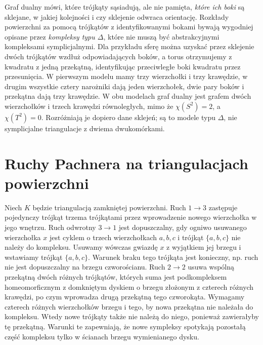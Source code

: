 \begin{uwaga}
Graf dualny mówi, które trójkąty sąsiadują, ale nie pamięta,
\emph{które ich boki} są sklejane, w jakiej kolejności i czy
sklejenie odwraca orientację. Rozkłady powierzchni za pomocą
trójkątów z identyfikowanymi bokami bywają wygodniej opisane
przez \emph{kompleksy typu $\Delta$}, które nie muszą być
abstrakcyjnymi kompleksami symplicjalnymi. Dla przykładu
sferę można uzyskać przez sklejenie dwóch trójkątów wzdłuż
odpowiadających boków, a torus otrzymujemy z kwadratu z jedną przekątną,
identyfikując przeciwległe boki kwadratu przez przesunięcia.
W pierwszym modelu mamy trzy wierzchołki i trzy krawędzie,
w drugim wszystkie cztery narożniki dają jeden wierzchołek,
dwie pary boków i przekątna dają trzy krawędzie. W obu
modelach graf dualny jest grafem dwóch wierzchołków
i trzech krawędzi równoległych, mimo że
$\chi(S^2)=2$, a $\chi(T^2)=0$. Rozróżniają je dopiero
dane sklejeń; są to modele typu $\Delta$, nie symplicjalne
triangulacje z dwiema dwukomórkami.
\end{uwaga}

\section{Ruchy Pachnera na triangulacjach powierzchni}
\label{sec:tg-pachner}

\begin{definicja}
Niech $K$ będzie triangulacją zamkniętej powierzchni.
Ruch $1\to3$ zastępuje pojedynczy trójkąt
trzema trójkątami przez wprowadzenie nowego wierzchołka
w jego wnętrzu. Ruch odwrotny $3\to1$ jest dopuszczalny,
gdy ogniwo usuwanego wierzchołka $x$ jest cyklem o trzech
wierzchołkach $a,b,c$ i trójkąt $\{a,b,c\}$ nie należy
do kompleksu. Usuwamy wówczas gwiazdę $x$ z wyjątkiem
jej brzegu i wstawiamy trójkąt $\{a,b,c\}$.
Warunek braku tego trójkąta jest konieczny, np. ruch
nie jest dopuszczalny na brzegu czworościanu.
Ruch $2\to2$ usuwa wspólną przekątną dwóch
różnych trójkątów, których suma jest podkompleksem
homeomorficznym z domkniętym dyskiem o brzegu złożonym
z czterech różnych krawędzi, po czym wprowadza drugą
przekątną tego czworokąta. Wymagamy czterech różnych wierzchołków brzegu i tego,
by nowa przekątna nie należała do kompleksu. Wtedy
nowe trójkąty także nie należą do niego, ponieważ
zawierałyby tę przekątną. Warunki te zapewniają,
że nowe sympleksy spotykają pozostałą część kompleksu
tylko w ścianach brzegu wymienianego dysku.
\end{definicja}


